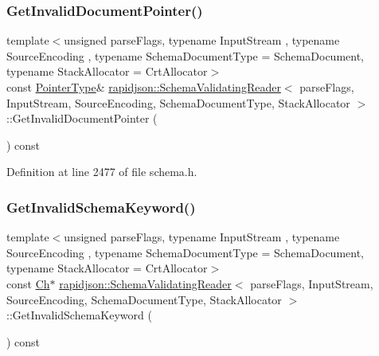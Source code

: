 \subsubsection{\texorpdfstring{GetInvalidDocumentPointer()}{GetInvalidDocumentPointer()}}
{\footnotesize\ttfamily template$<$unsigned parse\+Flags, typename Input\+Stream , typename Source\+Encoding , typename Schema\+Document\+Type  = Schema\+Document, typename Stack\+Allocator  = Crt\+Allocator$>$ \\
const \mbox{\hyperlink{classrapidjson_1_1_schema_validating_reader_a42c64d1ed25ffb2e70a35b9e43e0e564}{Pointer\+Type}}\& \mbox{\hyperlink{classrapidjson_1_1_schema_validating_reader}{rapidjson\+::\+Schema\+Validating\+Reader}}$<$ parse\+Flags, Input\+Stream, Source\+Encoding, Schema\+Document\+Type, Stack\+Allocator $>$\+::Get\+Invalid\+Document\+Pointer (\begin{DoxyParamCaption}{ }\end{DoxyParamCaption}) const}



Definition at line 2477 of file schema.\+h.


\begin{DoxyCode}{0}

\end{DoxyCode}
\mbox{\label{classrapidjson_1_1_schema_validating_reader_a67bf36f1e4bf24a0760170ed199f592b}} 
\subsubsection{\texorpdfstring{GetInvalidSchemaKeyword()}{GetInvalidSchemaKeyword()}}
{\footnotesize\ttfamily template$<$unsigned parse\+Flags, typename Input\+Stream , typename Source\+Encoding , typename Schema\+Document\+Type  = Schema\+Document, typename Stack\+Allocator  = Crt\+Allocator$>$ \\
const \mbox{\hyperlink{classrapidjson_1_1_schema_validating_reader_a3507a4886ce6778fe1cae39ed5f0baaf}{Ch}}$\ast$ \mbox{\hyperlink{classrapidjson_1_1_schema_validating_reader}{rapidjson\+::\+Schema\+Validating\+Reader}}$<$ parse\+Flags, Input\+Stream, Source\+Encoding, Schema\+Document\+Type, Stack\+Allocator $>$\+::Get\+Invalid\+Schema\+Keyword (\begin{DoxyParamCaption}{ }\end{DoxyParamCaption}) const}



